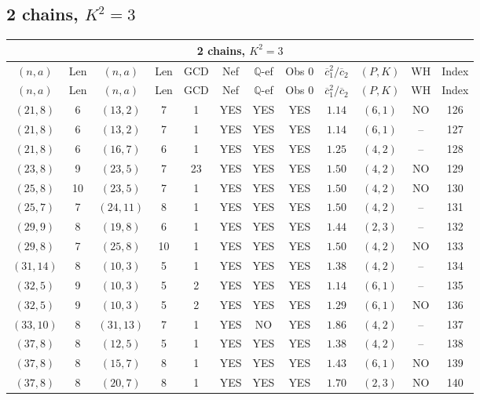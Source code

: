\subsection{2 chains, $K^2 = 3$}
\begin{longtable}{|c|c|c|c|c|c|c|c|c|c|c|c|}
\hline
\multicolumn{12}{|c|}{2 chains, $K^2 = 3$}\\
\hline
$(n,a)$ & Len & $(n,a)$ & Len & GCD & Nef & $\mathbb Q$-ef & Obs 0 & $\overline c_1^2 / \overline c_2$ & $(P,K)$ & WH & Index\\
\hline
\endfirsthead

\hline
$(n,a)$ & Len & $(n,a)$ & Len & GCD & Nef & $\mathbb Q$-ef & Obs 0 & $\overline c_1^2 / \overline c_2$ & $(P,K)$ & WH & Index\\
\hline
\endhead
\hline
\endfoot

$(21,8)$ & 6 & $(13,2)$ & 7 & 1 & YES & YES & YES & $1.14$ & $(6,1)$ & NO & 126\\
$(21,8)$ & 6 & $(13,2)$ & 7 & 1 & YES & YES & YES & $1.14$ & $(6,1)$ & -- & 127\\
$(21,8)$ & 6 & $(16,7)$ & 6 & 1 & YES & YES & YES & $1.25$ & $(4,2)$ & -- & 128\\
$(23,8)$ & 9 & $(23,5)$ & 7 & 23 & YES & YES & YES & $1.50$ & $(4,2)$ & NO & 129\\
$(25,8)$ & 10 & $(23,5)$ & 7 & 1 & YES & YES & YES & $1.50$ & $(4,2)$ & NO & 130\\
$(25,7)$ & 7 & $(24,11)$ & 8 & 1 & YES & YES & YES & $1.50$ & $(4,2)$ & -- & 131\\
$(29,9)$ & 8 & $(19,8)$ & 6 & 1 & YES & YES & YES & $1.44$ & $(2,3)$ & -- & 132\\
$(29,8)$ & 7 & $(25,8)$ & 10 & 1 & YES & YES & YES & $1.50$ & $(4,2)$ & NO & 133\\
$(31,14)$ & 8 & $(10,3)$ & 5 & 1 & YES & YES & YES & $1.38$ & $(4,2)$ & -- & 134\\
$(32,5)$ & 9 & $(10,3)$ & 5 & 2 & YES & YES & YES & $1.14$ & $(6,1)$ & -- & 135\\
$(32,5)$ & 9 & $(10,3)$ & 5 & 2 & YES & YES & YES & $1.29$ & $(6,1)$ & NO & 136\\
$(33,10)$ & 8 & $(31,13)$ & 7 & 1 & YES & NO & YES & $1.86$ & $(4,2)$ & -- & 137\\
$(37,8)$ & 8 & $(12,5)$ & 5 & 1 & YES & YES & YES & $1.38$ & $(4,2)$ & -- & 138\\
$(37,8)$ & 8 & $(15,7)$ & 8 & 1 & YES & YES & YES & $1.43$ & $(6,1)$ & NO & 139\\
$(37,8)$ & 8 & $(20,7)$ & 8 & 1 & YES & YES & YES & $1.70$ & $(2,3)$ & NO & 140\\

\end{longtable}
